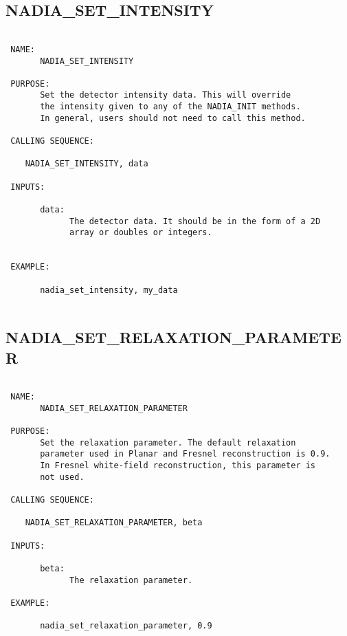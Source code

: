 \subsection{NADIA\_SET\_INTENSITY}
\begin{verbatim}

 NAME:
       NADIA_SET_INTENSITY

 PURPOSE:
       Set the detector intensity data. This will override 
       the intensity given to any of the NADIA_INIT methods.
       In general, users should not need to call this method.

 CALLING SEQUENCE:

	NADIA_SET_INTENSITY, data

 INPUTS:

       data: 
             The detector data. It should be in the form of a 2D
             array or doubles or integers.


 EXAMPLE:

       nadia_set_intensity, my_data


\end{verbatim}






  
 
\subsection{NADIA\_SET\_RELAXATION\_PARAMETER}
\begin{verbatim}

 NAME:
       NADIA_SET_RELAXATION_PARAMETER

 PURPOSE:
       Set the relaxation parameter. The default relaxation
       parameter used in Planar and Fresnel reconstruction is 0.9.
       In Fresnel white-field reconstruction, this parameter is 
       not used.

 CALLING SEQUENCE:

	NADIA_SET_RELAXATION_PARAMETER, beta

 INPUTS:

       beta: 
             The relaxation parameter.

 EXAMPLE:

       nadia_set_relaxation_parameter, 0.9

\end{verbatim}






  
 
